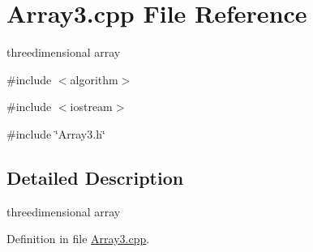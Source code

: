 \section{Array3.cpp File Reference}
\label{Array3_8cpp}


threedimensional array  


{\ttfamily \#include $<$algorithm$>$}\par
{\ttfamily \#include $<$iostream$>$}\par
{\ttfamily \#include \char`\"{}Array3.h\char`\"{}}\par


\subsection{Detailed Description}
threedimensional array 

Definition in file \hyperlink{Array3_8cpp_source}{Array3.cpp}.

